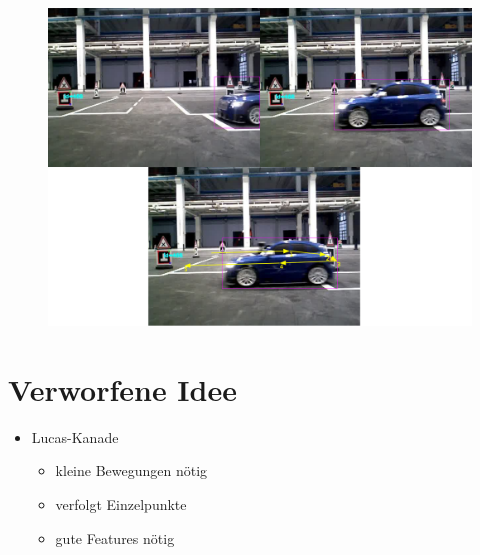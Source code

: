 \documentclass[10pt]{beamer}
\begin{document}
\begin{frame}

	\begin{figure}[h]
	\centering
	\includegraphics[scale=0.2]{./Abbildungen/08.png}
	\label{img:bsp4}
	\end{figure}

\end{frame}

\section{Verworfene Idee}
\begin{frame}{\secname}

\begin{itemize}
	\item Lucas-Kanade
	\begin{itemize}
	\item kleine Bewegungen nötig
	\item verfolgt Einzelpunkte
	\item gute Features nötig
	\end{itemize}

\end{itemize}

\end{frame}
\end{document}
